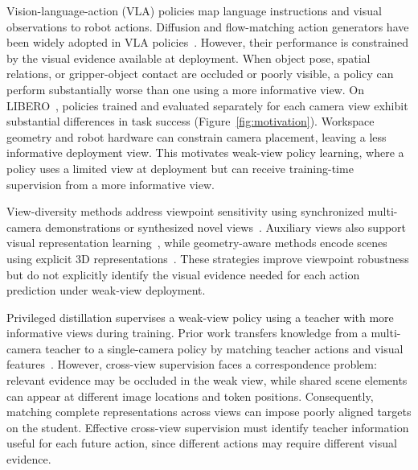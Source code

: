 \documentclass{ELSP}
\begin{document}
Vision-language-action (VLA) policies map language instructions and visual observations to robot actions.
Diffusion and flow-matching action generators have been widely adopted in VLA policies~\cite{doi:10.1177/02783649241273668,pmlr-v267-wen25g,BlackK-RSS-25}.
However, their performance is constrained by the visual evidence available at deployment.
When object pose, spatial relations, or gripper-object contact are occluded or poorly visible, a policy can perform substantially worse than one using a more informative view.
On LIBERO~\cite{NEURIPS2023_8c3c6668}, policies trained and evaluated separately for each camera view exhibit substantial differences in task success (Figure~\ref{fig:motivation}).
Workspace geometry and robot hardware can constrain camera placement, leaving a less informative deployment view.
This motivates weak-view policy learning, where a policy uses a limited view at deployment but can receive training-time supervision from a more informative view.

View-diversity methods address viewpoint sensitivity using synchronized multi-camera demonstrations or synthesized novel views~\cite{9636440,pmlr-v270-tian25a}. Auxiliary views also support visual representation learning~\cite{pmlr-v202-seo23a}, while geometry-aware methods encode scenes using explicit 3D representations~\cite{pmlr-v205-shridhar23a,pmlr-v229-goyal23a}. These strategies improve viewpoint robustness but do not explicitly identify the visual evidence needed for each action prediction under weak-view deployment.

Privileged distillation supervises a weak-view policy using a teacher with more informative views during training. Prior work transfers knowledge from a multi-camera teacher to a single-camera policy by matching teacher actions and visual features~\cite{10327777}. However, cross-view supervision faces a correspondence problem: relevant evidence may be occluded in the weak view, while shared scene elements can appear at different image locations and token positions. Consequently, matching complete representations across views can impose poorly aligned targets on the student. Effective cross-view supervision must identify teacher information useful for each future action, since different actions may require different visual evidence.
\end{document}
